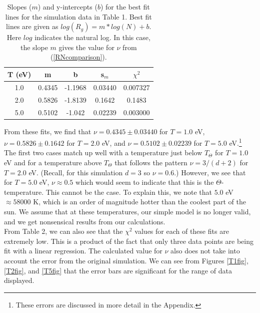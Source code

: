 \documentclass{article}
\begin{document}
\begin{multicols}{2}
\begin{table}
\begin{center}
\begin{tabular}{| c | c | c | c | c |}
\hline \textbf{T (eV)} & \textbf{m} & \textbf{b} & \textbf{s$_m$} & \textbf{$\chi ^2$} \\ \hline
1.0 & 0.4345 & -1.1968 & 0.03440 & 0.007327 \\ \hline
2.0 & 0.5826 & -1.8139 & 0.1642 & 0.1483 \\ \hline
5.0 & 0.5102 & -1.042 & 0.02239 & 0.003000 \\ \hline
\end{tabular}
\caption{Slopes ($m$) and y-intercepts ($b$) for the best fit lines for the simulation data in Table 1.  Best fit lines are given as $log(R_g) = m*log(N) + b$.  Here $log$ indicates the natural log.  In this case, the slope $m$ gives the value for $\nu$ from (\ref{RNcomparison}).}
\end{center}
\end{table}

From these fits, we find that $\nu = 0.4345 \pm 0.03440$ for $T=1.0$ eV, $\nu = 0.5826 \pm 0.1642$ for $T = 2.0$ eV, and $\nu = 0.5102 \pm 0.02239$ for $T = 5.0$ eV.\footnote{These errors are discussed in more detail in the Appendix.}  The first two cases match up well with a temperature just below $T_{\Theta}$ for $T=1.0$ eV and for a temperature above $T_{\Theta}$ that follows the pattern $\nu = 3/(d+2)$ for $T = 2.0$ eV.  (Recall, for this simulation $d=3$ so $\nu = 0.6$.)  However, we see that for $T = 5.0$ eV, $\nu \approx 0.5$ which would seem to indicate that this is the $\Theta$-temperature. This cannot be the case.  To explain this, we note that $5.0$ eV $\approx 58000$ K, which is an order of magnitude hotter than the coolest part of the sun.  \cite{sun}  We assume that at these temperatures, our simple model is no longer valid, and we get nonsensical results from our calculations.  \\

From Table 2, we can also see that the $\chi^2$ values for each of these fits are extremely low.  This is a product of the fact that only three data points are being fit with a linear regression.  The calculated value for $\nu$ also does not take into account the error from the original simulation.  We can see from Figures \ref{T1fig}, \ref{T2fig}, and \ref{T5fig} that the error bars are significant for the range of data displayed.\\


\end{multicols}
\end{document}
